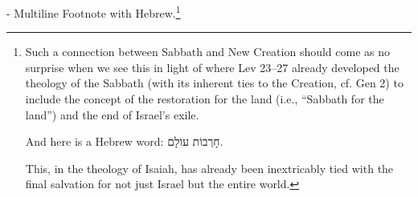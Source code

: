 \documentclass{article}
\begin{document}
- Multiline Footnote with Hebrew.\footnote{
	Such a connection between Sabbath and New Creation should come as no surprise when we see this in light of where Lev 23--27 already developed the theology of the Sabbath (with its inherent ties to the Creation, cf. Gen 2) to include the concept of the restoration for the land (i.e., ``Sabbath for the land'') and the end of Israel's exile. 
	
	And here is a Hebrew word: \foreignlanguage{hebrew}{חָרְבוֹת עוֹלָם}.
	
	This, in the theology of Isaiah, has already been inextricably tied with the final salvation for not just Israel but the entire world.} 
\end{document}
